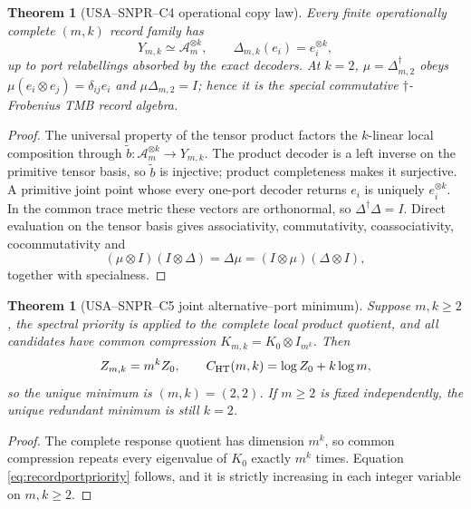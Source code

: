 \documentclass[11pt,a4paper]{article}
\newtheorem{theorem}[definition]{Theorem}
\theoremstyle{remark}
\begin{document}
\begin{theorem}[USA--SNPR--C4 operational copy law]
Every finite operationally complete $(m,k)$ record family has
\begin{equation}
 Y_{m,k}\simeq\mathcal A_m^{\otimes k},
 \qquad
 \Delta_{m,k}(e_i)=e_i^{\otimes k},
 \label{eq:operationalcopy}
\end{equation}
up to port relabellings absorbed by the exact decoders.  At $k=2$,
$\mu=\Delta_{m,2}^{\dagger}$ obeys
$\mu(e_i\otimes e_j)=\delta_{ij}e_i$ and
$\mu\Delta_{m,2}=I$; hence it is the special commutative
$\dagger$-Frobenius TMB record algebra.
\label{thm:operationalcopy}
\end{theorem}

\begin{proof}
The universal property of the tensor product factors the $k$-linear local
composition through
$\widetilde b:\mathcal A_m^{\otimes k}\to Y_{m,k}$.  The product decoder is
a left inverse on the primitive tensor basis, so $\widetilde b$ is injective;
product completeness makes it surjective.  A primitive joint point whose
every one-port decoder returns $e_i$ is uniquely
$e_i^{\otimes k}$.  In the common trace metric these vectors are orthonormal,
so $\Delta^{\dagger}\Delta=I$.  Direct evaluation on the tensor basis gives
associativity, commutativity, coassociativity, cocommutativity and
\begin{equation}
 (\mu\otimes I)(I\otimes\Delta)
 =\Delta\mu
 =(I\otimes\mu)(\Delta\otimes I),
\end{equation}
together with specialness.
\end{proof}

\begin{theorem}[USA--SNPR--C5 joint alternative--port minimum]
Suppose $m,k\ge2$, the spectral priority is applied to the complete local
product quotient, and all candidates have common compression
$K_{m,k}=K_0\otimes I_{m^k}$.  Then
\begin{equation}
 Z_{m,k}=m^k Z_0,
 \qquad
 C_{\rm HT}(m,k)=\log Z_0+k\log m,
 \label{eq:recordportpriority}
\end{equation}
so the unique minimum is $(m,k)=(2,2)$.  If $m\ge2$ is fixed independently,
the unique redundant minimum is still $k=2$.
\label{thm:recordportminimum}
\end{theorem}

\begin{proof}
The complete response quotient has dimension $m^k$, so common compression
repeats every eigenvalue of $K_0$ exactly $m^k$ times.  Equation
\eqref{eq:recordportpriority} follows, and it is strictly increasing in each
integer variable on $m,k\ge2$.
\end{proof}
\end{document}
